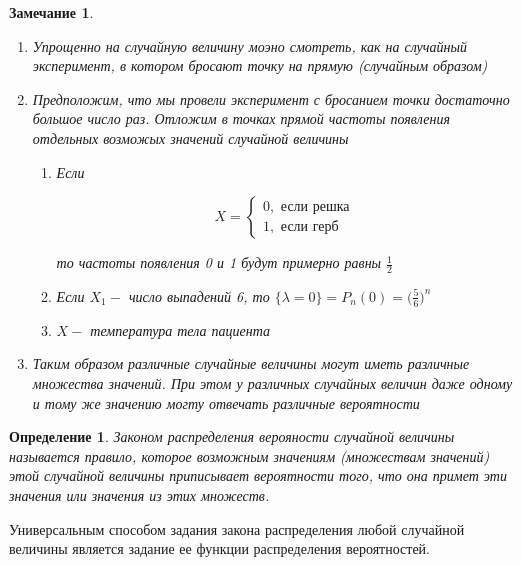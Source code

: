 \documentclass[a4paper, 14pt]{report}
\newtheorem{defenition}{Определение}[section]
\newtheorem{note}{Замечание}[section]
\begin{document}
\begin{note}
    \hfill

    \begin{enumerate}
        \item Упрощенно на случайную величину моэно смотреть, как на случайный эксперимент, в котором бросают точку на прямую (случайным образом)
        \item Предположим, что мы провели эксперимент с бросанием точки достаточно большое число раз. Отложим в точках прямой частоты появления отдельных возможых значений случайной величины

            \begin{enumerate}
                \item Если

                    $$
                    X =
                    \begin{cases}
                        0, \text{ если решка} \\
                        1, \text{ если герб}
                    \end{cases}
                    $$

                    то частоты появления 0 и 1 будут примерно равны $\frac{1}{2}$

                \item Если $X_1 -$ число выпадений 6, то $\{ \lambda = 0\} = P_n(0) = \big( \frac{5}{6} \big)^n$

                \item $X - $ температура тела пациента
            \end{enumerate}

        \item Таким образом различные случайные величины могут иметь различные множества значений. При этом у различных случайных величин даже одному и тому же значению могту отвечать различные вероятности
    \end{enumerate}
\end{note}

\begin{defenition}
    Законом распределения верояности случайной величины называется правило, которое возможным значениям (множествам значений) этой случайной величины приписывает вероятности того, что она примет эти значения или значения из этих множеств.
\end{defenition}

Универсальным способом задания закона распределения любой случайной величины является задание ее функции распределения вероятностей.
\end{document}

